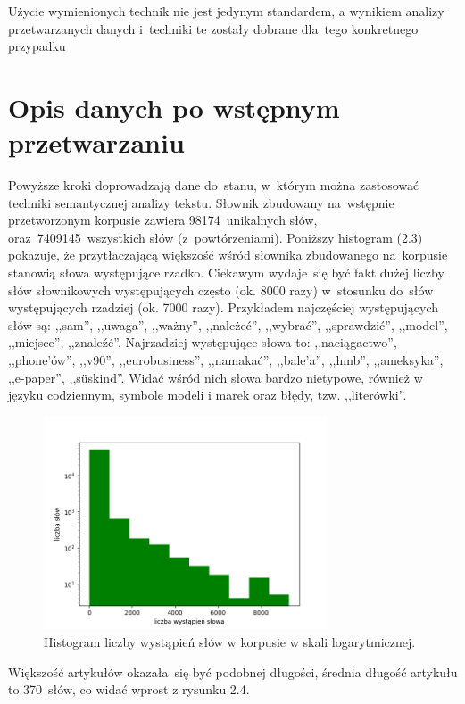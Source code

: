 \documentclass[pl]{minipw} %
\begin{document}
Użycie wymienionych technik nie jest jedynym standardem, a wynikiem analizy przetwarzanych danych i~techniki te zostały dobrane dla~tego konkretnego przypadku

\section{Opis danych po wstępnym przetwarzaniu}

Powyższe kroki doprowadzają dane do~stanu, w~którym można zastosować techniki semantycznej analizy tekstu. Słownik zbudowany na~wstępnie przetworzonym korpusie zawiera 98174~unikalnych słów, oraz~7409145~wszystkich słów (z~powtórzeniami). Poniższy histogram (2.3) pokazuje, że przytłaczającą większość wśród słownika zbudowanego na~korpusie stanowią słowa występujące rzadko. Ciekawym wydaje~się być fakt dużej liczby słów słownikowych występujących często (ok. 8000 razy) w~stosunku do~słów występujących rzadziej (ok. 7000 razy). Przykładem najczęściej występujących słów są: ,,sam'', ,,uwaga'', ,,ważny'', ,,należeć'', ,,wybrać'', ,,sprawdzić'', ,,model'', ,,miejsce'', ,,znaleźć''. Najrzadziej występujące słowa to: ,,naciągactwo'', ,,phone’ów'', ,,v90'', ,,eurobusiness'', ,,namakać'', ,,bale’a'', ,,hmb'', ,,ameksyka'', ,,e-paper'', ,,süskind''. Widać wśród nich słowa bardzo nietypowe, również w języku codziennym, symbole modeli i marek oraz błędy, tzw. ,,literówki''.

\begin{figure}[H]
	\centering
	\includegraphics[width=0.75\textwidth]{img/words_hist_log.png}
	\caption{Histogram liczby wystąpień słów w korpusie w skali logarytmicznej.}
\end{figure}

Większość artykułów okazała~się być podobnej długości, średnia długość artykułu to 370~słów, co widać wprost z rysunku 2.4.
\end{document}
